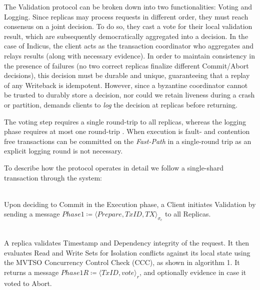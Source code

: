 The Validation protocol can be broken down into two functionalities: Voting and Logging.
Since \sys replicas may process requests in different order, they must reach consensus on a joint  decision. To do so, they cast a vote for their local validation result, which are subsequently democratically aggregated into a decision. In the case of Indicus, the client acts as the transaction coordinator who aggregates and relays results (along with necessary evidence).
In order to maintain consistency in the presence of failures (no two correct replicas finalize different Commit/Abort decisions), this decision must be durable and unique, guaranteeing that a replay of any Writeback is idempotent. However, since a byzantine coordinator cannot be trusted to durably store a decision, nor could we retain liveness during a crash or partition, \sys demands clients to \textit{log} the decision at replicas before returning.
 

The voting step requires a single round-trip to all replicas, whereas the logging phase requires at most one round-trip . When execution is fault- and contention free transactions can be committed on the \textit{Fast-Path} in a single-round trip as an explicit logging round is not necessary.


To describe how the protocol operates in detail we follow a single-shard transaction through the system:

\\
Upon deciding to Commit in the Execution phase, a Client initiates Validation by sending a message $Phase1 \coloneqq \langle Prepare, TxID, TX \rangle_{\sigma_c}$ to all Replicas.

\\
A replica validates Timestamp and Dependency integrity of the request. It then evaluates Read and Write Sets for Isolation conflicts against its local state using the MVTSO Concurrency Control Check (CCC), as shown in algorithm 1. It returns a message $Phase1R \coloneqq \langle TxID, vote \rangle_r$, and optionally evidence in case it voted to Abort.

